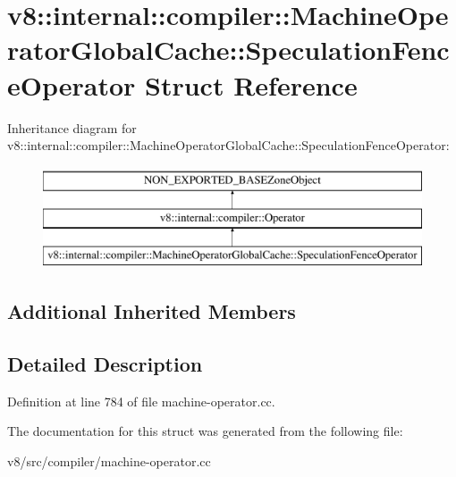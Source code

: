 \hypertarget{structv8_1_1internal_1_1compiler_1_1MachineOperatorGlobalCache_1_1SpeculationFenceOperator}{}\section{v8\+:\+:internal\+:\+:compiler\+:\+:Machine\+Operator\+Global\+Cache\+:\+:Speculation\+Fence\+Operator Struct Reference}
\label{structv8_1_1internal_1_1compiler_1_1MachineOperatorGlobalCache_1_1SpeculationFenceOperator}
Inheritance diagram for v8\+:\+:internal\+:\+:compiler\+:\+:Machine\+Operator\+Global\+Cache\+:\+:Speculation\+Fence\+Operator\+:\begin{figure}[H]
\begin{center}
\leavevmode
\includegraphics[height=3.000000cm]{structv8_1_1internal_1_1compiler_1_1MachineOperatorGlobalCache_1_1SpeculationFenceOperator}
\end{center}
\end{figure}
\subsection*{Additional Inherited Members}


\subsection{Detailed Description}


Definition at line 784 of file machine-\/operator.\+cc.



The documentation for this struct was generated from the following file\+:\begin{DoxyCompactItemize}
\item 
v8/src/compiler/machine-\/operator.\+cc\end{DoxyCompactItemize}
